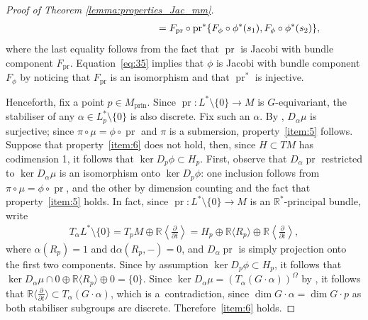 \documentclass[10pt,a4paper]{amsart}
\numberwithin{equation}{section}
\newcommand{\de}{\mathrm{d}} %
\newcommand{\RR}{\mathbb{R}}
\begin{document}
\begin{proof}[Proof of Theorem \ref{lemma:properties_Jac_mm}]
\begin{gather}
\hphantom{F_{\operatorname{pr}} \circ \operatorname{pr}^* \circ F_{\phi} \circ \phi^*\{s_1,s_2\}}{}
=F_{\operatorname{pr}} \circ \operatorname{pr}^* \{F_{\phi} \circ \phi^*(s_1), F_{\phi} \circ \phi^*(s_2)\},\label{eq:35}
\end{gather}
where the last equality follows from the fact that $\operatorname{pr}$ is Jacobi with bundle component $F_{\operatorname{pr}}$. Equation~\eqref{eq:35} implies that $\phi$ is Jacobi with bundle component $F_{\phi}$ by noticing that $F_{\operatorname{pr}}$ is an isomorphism and that $\operatorname{pr}^*$ is injective.

Henceforth, f\/ix a point $p \in M_{\mathrm{prin}}$. Since $\operatorname{pr} \colon L^* \setminus \{0\} \to M$ is $G$-equivariant, the stabiliser of any $\alpha \in L_p^* \setminus \{0\}$ is also discrete. Fix such an $\alpha$. By \cite[Corollary~5.1.2]{gui_sja}, $D_{\alpha} \mu$ is surjective; since $\pi \circ \mu = \phi \circ \operatorname{pr}$ and $\pi$ is a submersion, property~\ref{item:5} follows. Suppose that property~\ref{item:6} does not hold, then, since $H \subset TM$ has codimension 1, it follows that $\ker D_p \phi \subset H_p$. First, observe that $D_{\alpha} \operatorname{pr}$ restricted to $\ker D_{\alpha} \mu$ is an isomorphism onto $\ker D_p \phi$: one inclusion follows from $\pi \circ \mu = \phi \circ \operatorname{pr}$, and the other by dimension counting and the fact that property~\ref{item:5} holds. In fact, since $\operatorname{pr}\colon L^* \setminus \{0\} \to M$ is an $\RR^*$-principal bundle, write
 \begin{gather*}
 T_{\alpha} L^* \setminus \{0\} = T_p M \oplus \RR \left\langle \frac{\partial}{\partial t} \right\rangle = H_p \oplus \RR\langle R_p
 \rangle \oplus \RR \left\langle \frac{\partial}{\partial t} \right\rangle,
 \end{gather*}
where $\alpha(R_p) = 1$ and $\de \alpha(R_p,-) = 0$, and $D_{\alpha}\operatorname{pr}$ is simply projection onto the f\/irst two components. Since by assumption $\ker D_p \phi \subset H_p$, it follows that $\ker D_{\alpha} \mu \cap 0 \oplus \RR\langle R_p \rangle \oplus 0 = \{0\}$. Since $\ker D_{\alpha} \mu = ( T_{\alpha}(G \cdot \alpha))^{\Omega}$ by \cite[Corollary~5.1.4]{gui_sja}, it follows that $\RR \langle \frac{\partial}{\partial t} \rangle \subset T_{\alpha}(G \cdot \alpha)$, which is a~contradiction, since $\dim G \cdot \alpha = \dim G \cdot p$ as both stabiliser subgroups are discrete. Therefore~\ref{item:6} holds.


\end{proof}
\end{document}
